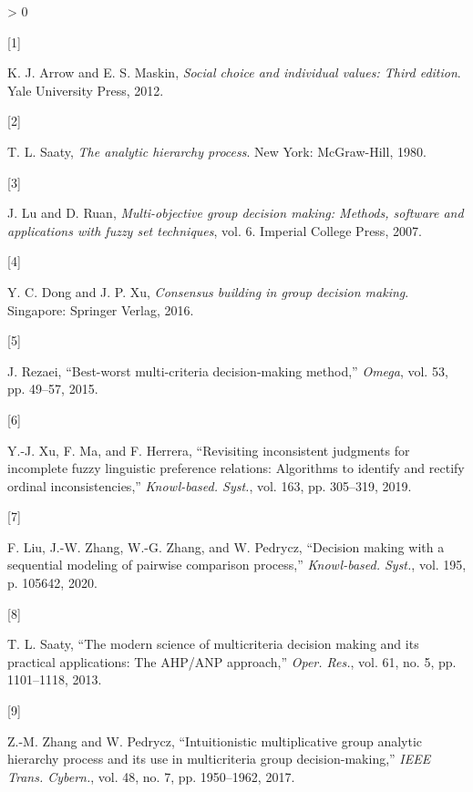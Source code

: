 \documentclass[
]{article}
\newlength{\cslhangindent}
\newlength{\csllabelwidth}
\newenvironment{CSLReferences}[2] %
 {%
  \setlength{\parindent}{0pt}
  \ifodd #1 \everypar{\setlength{\hangindent}{\cslhangindent}}\ignorespaces\fi
  \ifnum #2 > 0
  \setlength{\parskip}{#2\baselineskip}
  \fi
 }%
 {}
\newcommand{\CSLLeftMargin}[1]{\parbox[t]{\csllabelwidth}{#1}}
\newcommand{\CSLRightInline}[1]{\parbox[t]{\linewidth - \csllabelwidth}{#1}\break}
\begin{document}
\hypertarget{refs}{}
\begin{CSLReferences}{0}{0}
\leavevmode\hypertarget{ref-arrow2012social}{}%
\CSLLeftMargin{{[}1{]} }
\CSLRightInline{K. J. Arrow and E. S. Maskin, \emph{Social choice and
individual values: Third edition}. {Yale University Press}, 2012.}

\leavevmode\hypertarget{ref-saaty1980analytic}{}%
\CSLLeftMargin{{[}2{]} }
\CSLRightInline{T. L. Saaty, \emph{The analytic hierarchy process}. {New
York}: {McGraw-Hill}, 1980.}

\leavevmode\hypertarget{ref-lu2007multi}{}%
\CSLLeftMargin{{[}3{]} }
\CSLRightInline{J. Lu and D. Ruan, \emph{Multi-objective group decision
making: Methods, software and applications with fuzzy set techniques},
vol. 6. {Imperial College Press}, 2007.}

\leavevmode\hypertarget{ref-dong2016consensus}{}%
\CSLLeftMargin{{[}4{]} }
\CSLRightInline{Y. C. Dong and J. P. Xu, \emph{Consensus building in
group decision making}. {Singapore}: {Springer Verlag}, 2016.}

\leavevmode\hypertarget{ref-rezaei2015bestworst}{}%
\CSLLeftMargin{{[}5{]} }
\CSLRightInline{J. Rezaei, {``Best-worst multi-criteria decision-making
method,''} \emph{Omega}, vol. 53, pp. 49--57, 2015.}

\leavevmode\hypertarget{ref-xu2019revisiting}{}%
\CSLLeftMargin{{[}6{]} }
\CSLRightInline{Y.-J. Xu, F. Ma, and F. Herrera, {``Revisiting
inconsistent judgments for incomplete fuzzy linguistic preference
relations: {Algorithms} to identify and rectify ordinal
inconsistencies,''} \emph{Knowl-based. Syst.}, vol. 163, pp. 305--319,
2019.}

\leavevmode\hypertarget{ref-liu2020decision}{}%
\CSLLeftMargin{{[}7{]} }
\CSLRightInline{F. Liu, J.-W. Zhang, W.-G. Zhang, and W. Pedrycz,
{``Decision making with a sequential modeling of pairwise comparison
process,''} \emph{Knowl-based. Syst.}, vol. 195, p. 105642, 2020.}

\leavevmode\hypertarget{ref-saaty2013modern}{}%
\CSLLeftMargin{{[}8{]} }
\CSLRightInline{T. L. Saaty, {``The modern science of multicriteria
decision making and its practical applications: {The AHP}/{ANP}
approach,''} \emph{Oper. Res.}, vol. 61, no. 5, pp. 1101--1118, 2013.}

\leavevmode\hypertarget{ref-ZhangZM2018}{}%
\CSLLeftMargin{{[}9{]} }
\CSLRightInline{Z.-M. Zhang and W. Pedrycz, {``Intuitionistic
multiplicative group analytic hierarchy process and its use in
multicriteria group decision-making,''} \emph{IEEE Trans. Cybern.}, vol.
48, no. 7, pp. 1950--1962, 2017.}


\end{CSLReferences}
\end{document}
